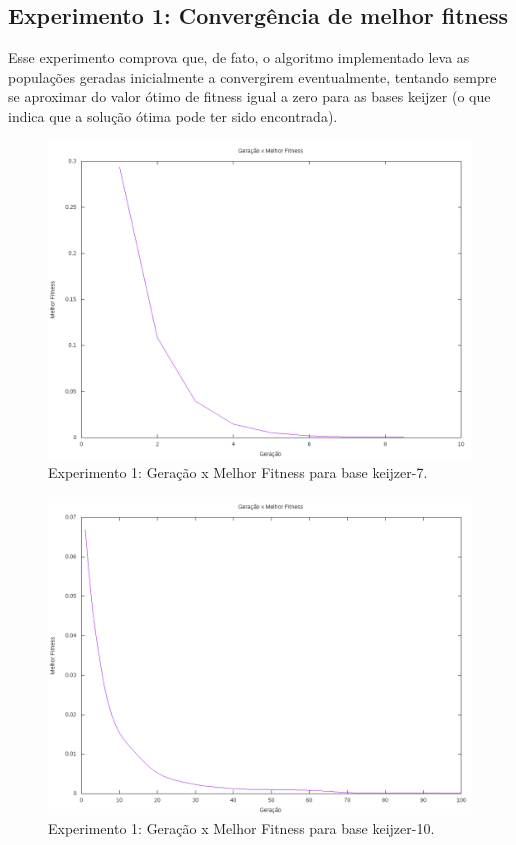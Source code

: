 \documentclass[12pt]{article}
\begin{document}
\subsection{Experimento 1: Convergência de melhor fitness}

Esse experimento comprova que, de fato, o algoritmo implementado leva as populações
geradas inicialmente a convergirem eventualmente, tentando sempre se aproximar do valor
ótimo de fitness igual a zero para as bases keijzer (o que indica que a solução ótima
pode ter sido encontrada).

\begin{figure}[ht]
  \centering
  \includegraphics[width=1\textwidth]{exp1k7.png}
  \caption{Experimento 1: Geração x Melhor Fitness para base keijzer-7.}
  \label{fig:exp1k7}
\end{figure}

\begin{figure}[ht]
  \centering
  \includegraphics[width=1\textwidth]{exp1k10.png}
  \caption{Experimento 1: Geração x Melhor Fitness para base keijzer-10.}
  \label{fig:exp1k10}
\end{figure}
\end{document}
